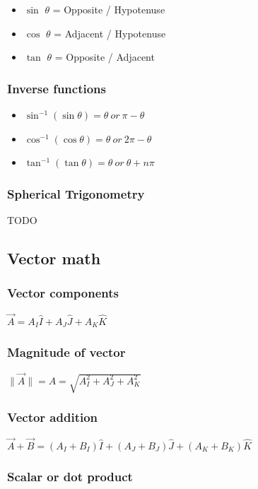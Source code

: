 \documentclass{article}
\begin{document}
\begin{itemize}
	\item $\sin$ $\theta$ = Opposite / Hypotenuse
	\item $\cos$ $\theta$ = Adjacent / Hypotenuse
	\item $\tan$ $\theta$ = Opposite / Adjacent
\end{itemize}

\subsubsection*{Inverse functions}
\begin{itemize}
	\item $\sin^{-1} (\sin \theta) = \theta\ or\ \pi - \theta$
	\item $\cos^{-1} (\cos \theta) = \theta\ or\ 2\pi - \theta$
	\item $\tan^{-1} (\tan \theta) = \theta\ or\ \theta + n\pi$
\end{itemize}

\subsubsection*{Spherical Trigonometry}
TODO

\subsection{Vector math}
\subsubsection*{Vector components}
$\vec{A} = A_I\hat{I} + A_J\hat{J} + A_K\hat{K}$

\subsubsection*{Magnitude of vector}
$\lVert\vec{A}\rVert = A = \sqrt{A_I^2 + A_J^2 + A_K^2}$

\subsubsection*{Vector addition}
$\vec{A} + \vec{B} = (A_I + B_I)\hat{I} + (A_J + B_J)\hat{J} + (A_K + B_K)\hat{K}$

\subsubsection*{Scalar or dot product}
\end{document}
